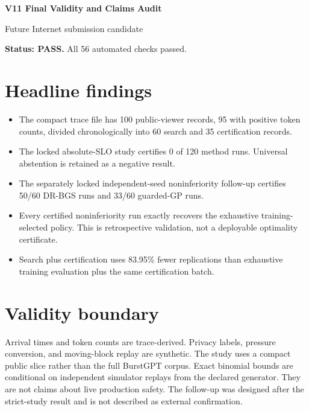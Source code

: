 \documentclass[11pt]{article}
\begin{document}
\begin{center}
{\Large\bfseries V11 Final Validity and Claims Audit}\par
\vspace{4pt}
{\large Future Internet submission candidate}\par
\end{center}

\textbf{Status: PASS.} All 56 automated checks passed.

\section*{Headline findings}
\begin{itemize}
\item The compact trace file has 100 public-viewer records, 95 with positive token counts, divided chronologically into 60 search and 35 certification records.
\item The locked absolute-SLO study certifies 0 of 120 method runs. Universal abstention is retained as a negative result.
\item The separately locked independent-seed noninferiority follow-up certifies 50/60 DR-BGS runs and 33/60 guarded-GP runs.
\item Every certified noninferiority run exactly recovers the exhaustive training-selected policy. This is retrospective validation, not a deployable optimality certificate.
\item Search plus certification uses 83.95\% fewer replications than exhaustive training evaluation plus the same certification batch.
\end{itemize}

\section*{Validity boundary}
Arrival times and token counts are trace-derived. Privacy labels, pressure conversion, and moving-block replay are synthetic. The study uses a compact public slice rather than the full BurstGPT corpus. Exact binomial bounds are conditional on independent simulator replays from the declared generator. They are not claims about live production safety. The follow-up was designed after the strict-study result and is not described as external confirmation.
\end{document}
